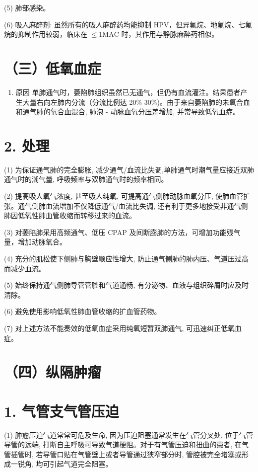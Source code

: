\documentclass[10pt]{article}
\begin{document}
(5) 肺部感染。

(6) 吸人麻醉剂: 虽然所有的吸人麻醉药均能抑制 HPV，但异氟烷、地氟烷、七氟烷的抑制作用较弱，临床在 $\leqslant 1 \mathrm{MAC}$ 时，其作用与静脉麻醉药相似。

\section*{（三）低氧血症}
\begin{enumerate}
  \item 原因 单肺通气时，萎陷肺组织虽然已无通气，但仍有血流灌注。结果患者产生大量右向左肺内分流（分流比例达 20\% 30\%)。由于来自萎陷肺的未氧合血和通气肺的氧合血混合, 肺泡 - 动脉血氧分压差增加, 并常导致低氧血症。
\end{enumerate}

\section*{2. 处理}
(1) 为保证通气肺的完全膨胀, 减少通气/血流比失调,单肺通气时潮气量应接近双肺通气时的潮气量, 呼吸频率与双肺通气时的频率相同。

(2) 提高吸人氧气浓度, 甚至吸人纯氧, 可提高通气侧肺动脉血氧分压, 使肺血管扩张。通气侧肺血流增加不仅降低通气/血流比失调, 还有利于更多地接受非通气侧肺因低氧性肺血管收缩而转移过来的血流。

(3) 对萎陷肺采用高频通气、低压 CPAP 及间断膨肺的方法，可增加功能残气量，增加动脉氧合。

(4) 充分的肌松使下侧肺与胸壁顺应性增大, 防止通气侧肺的肺内压、气道压过高而减少血流。

(5) 始终保持通气侧肺导管管腔和气道通畅, 有分泌物、血液与组织碎屑时应及时清除。

(6) 避免使用影响低氧性肺血管收缩的扩血管药物。

(7) 对上述方法不能奏效的低氧血症采用纯氧短暂双肺通气, 可迅速纠正低氧血症。

\section*{（四）纵隔肿瘤}
\section*{1. 气管支气管压迫}
(1) 肿瘤压迫气道常常可危及生命, 因为压迫阻塞通常发生在气管分叉处, 位于气管导管的远端, 打断自主呼吸可导致气道梗阻。对于有气管压迫和扭曲的患者, 在气管插管时, 若导管口贴在气管壁上或者导管通过狭窄部分时, 管腔被完全堵塞或形成一锐角, 均可引起气道完全阻塞。
\end{document}
